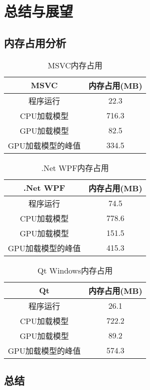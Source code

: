 \chapter{总结与展望}
\label{chapter:12}

\section{内存占用分析}

\begin{table}[!ht]
	\centering
	\caption{MSVC内存占用}
	\begin{tabular}{cc}
		\hline
		MSVC & 内存占用(MB) \\ \hline
		程序运行 & 22.3 \\
		CPU加载模型 & 716.3 \\
		GPU加载模型 & 82.5 \\
		GPU加载模型的峰值 & 334.5 \\ \hline
	\end{tabular}
	\label{memory_msvc}
\end{table}

\begin{table}[!ht]
	\centering
	\caption{.Net WPF内存占用}
	\begin{tabular}{cc}
		\hline
		.Net WPF & 内存占用(MB) \\ \hline
		程序运行 & 74.5 \\
		CPU加载模型 & 778.6 \\
		GPU加载模型 & 151.5 \\
		GPU加载模型的峰值 & 415.3 \\ \hline
	\end{tabular}
	\label{memory_dotnet}
\end{table}

\begin{table}[!ht]
	\centering
	\caption{Qt Windows内存占用}
	\begin{tabular}{cc}
		\hline
		Qt & 内存占用(MB) \\ \hline
		程序运行 & 26.1 \\
		CPU加载模型 & 722.2 \\
		GPU加载模型 & 89.2 \\
		GPU加载模型的峰值 & 574.3 \\ \hline
	\end{tabular}
	\label{memory_qt_windows}
\end{table}

\section{总结}

